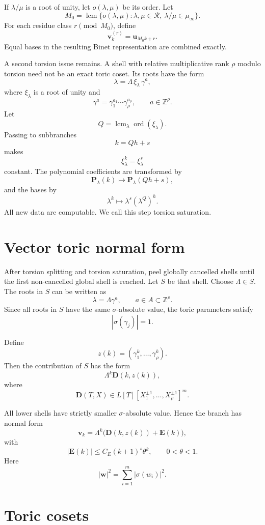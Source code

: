 \documentclass[11pt]{article}
\newcommand{\Z}{\mathbb Z}
\begin{document}
If \(\lambda/\mu\) is a root of unity, let \(o(\lambda,\mu)\) be its order. Let
\[
M_0=\operatorname{lcm}\{o(\lambda,\mu):\lambda,\mu\in\mathcal R,\ \lambda/\mu\in\mu_\infty\}.
\]
For each residue class \(r\pmod{M_0}\), define
\[
\mathbf v^{(r)}_k=\mathbf u_{M_0k+r}.
\]
Equal bases in the resulting Binet representation are combined exactly.

A second torsion issue remains. A shell with relative multiplicative rank \(\rho\) modulo torsion need not be an exact toric coset. Its roots have the form
\[
\lambda=\Lambda\,\xi_\lambda\,\gamma^a,
\]
where \(\xi_\lambda\) is a root of unity and
\[
\gamma^a=\gamma_1^{a_1}\cdots\gamma_\rho^{a_\rho},
\qquad
a\in\Z^\rho.
\]
Let
\[
Q=\operatorname{lcm}_{\lambda}\operatorname{ord}(\xi_\lambda).
\]
Passing to subbranches
\[
k=Qh+s
\]
makes
\[
\xi_\lambda^k=\xi_\lambda^s
\]
constant. The polynomial coefficients are transformed by
\[
\mathbf P_\lambda(k)\mapsto \mathbf P_\lambda(Qh+s),
\]
and the bases by
\[
\lambda^k\mapsto \lambda^s(\lambda^Q)^h.
\]
All new data are computable. We call this step torsion saturation.

\section{Vector toric normal form}

After torsion splitting and torsion saturation, peel globally cancelled shells until the first non-cancelled global shell is reached. Let \(S\) be that shell. Choose \(\Lambda\in S\). The roots in \(S\) can be written as
\[
\lambda=\Lambda\gamma^a,
\qquad
a\in A\subset\Z^\rho.
\]
Since all roots in \(S\) have the same \(\sigma\)-absolute value, the toric parameters satisfy
\[
|\sigma(\gamma_j)|=1.
\]

Define
\[
z(k)=(\gamma_1^k,\ldots,\gamma_\rho^k).
\]
Then the contribution of \(S\) has the form
\[
\Lambda^k\mathbf D(k,z(k)),
\]
where
\[
\mathbf D(T,X)\in L[T][X_1^{\pm1},\ldots,X_\rho^{\pm1}]^m.
\]

All lower shells have strictly smaller \(\sigma\)-absolute value. Hence the branch has normal form
\[
\mathbf v_k=\Lambda^k\bigl(\mathbf D(k,z(k))+\mathbf E(k)\bigr),
\]
with
\[
|\mathbf E(k)|\le C_E(k+1)^s\theta^k,
\qquad
0<\theta<1.
\]
Here
\[
|\mathbf w|^2=\sum_{i=1}^m|\sigma(w_i)|^2.
\]

\section{Toric cosets}
\end{document}
